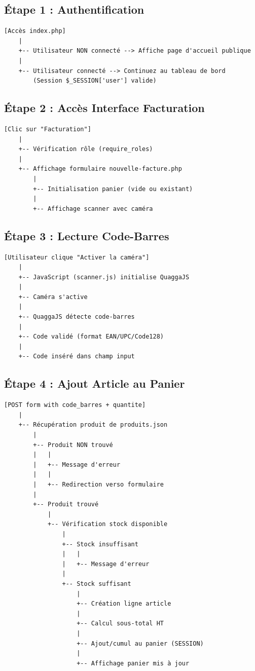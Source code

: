 \documentclass[12pt,a4paper]{report}
\begin{document}
\subsection{Étape 1 : Authentification}

\begin{verbatim}
[Accès index.php]
    |
    +-- Utilisateur NON connecté --> Affiche page d'accueil publique
    |
    +-- Utilisateur connecté --> Continuez au tableau de bord
        (Session $_SESSION['user'] valide)
\end{verbatim}

\subsection{Étape 2 : Accès Interface Facturation}

\begin{verbatim}
[Clic sur "Facturation"]
    |
    +-- Vérification rôle (require_roles)
    |
    +-- Affichage formulaire nouvelle-facture.php
        |
        +-- Initialisation panier (vide ou existant)
        |
        +-- Affichage scanner avec caméra
\end{verbatim}

\subsection{Étape 3 : Lecture Code-Barres}

\begin{verbatim}
[Utilisateur clique "Activer la caméra"]
    |
    +-- JavaScript (scanner.js) initialise QuaggaJS
    |
    +-- Caméra s'active
    |
    +-- QuaggaJS détecte code-barres
    |
    +-- Code validé (format EAN/UPC/Code128)
    |
    +-- Code inséré dans champ input
\end{verbatim}

\subsection{Étape 4 : Ajout Article au Panier}

\begin{verbatim}
[POST form with code_barres + quantite]
    |
    +-- Récupération produit de produits.json
        |
        +-- Produit NON trouvé
        |   |
        |   +-- Message d'erreur
        |   |
        |   +-- Redirection verso formulaire
        |
        +-- Produit trouvé
            |
            +-- Vérification stock disponible
                |
                +-- Stock insuffisant
                |   |
                |   +-- Message d'erreur
                |
                +-- Stock suffisant
                    |
                    +-- Création ligne article
                    |
                    +-- Calcul sous-total HT
                    |
                    +-- Ajout/cumul au panier (SESSION)
                    |
                    +-- Affichage panier mis à jour
\end{verbatim}
\end{document}
